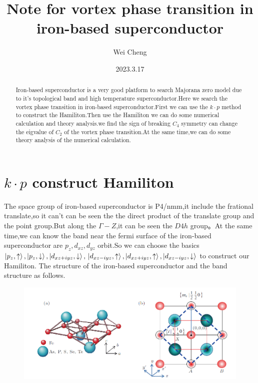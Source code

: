 \documentclass[5pt]{article}
\title{\LARGE {Note for vortex phase transition in iron-based superconductor}}
\author{\Large{Wei Cheng}}
\date{\Large{2023.3.17}}
\begin{document}
	\maketitle
	\Large
	\tableofcontents
	\everymath{\displaystyle}
	\begin{abstract}
		\Large
		Iron-based superconductor is a very good platform to search Majorana zero model due to it's topological band and high temperature superconductor.Here we search the vortex phase transition in iron-based superconductor.First we can use the $k\cdot p$ method to construct the Hamiliton.Then use the Hamiliton we can do some numerical calculation and theory analysis.we find the sign of breaking $C_4$ symmetry can change the eigvalue of $C_2$ of the vortex phase transition.At the same time,we can do some theory analysis of the numerical calculation.
	\end{abstract}
\section{$k\cdot p$ construct Hamiliton}
The space group of iron-based superconductor is P4/nmm,it include the frational translate,so it can't can be seen the the direct product of the translate group and the point group.But along the $\Gamma-Z$,it can be seen the $D4h$ group。At the same time,we can know the band near the fermi surface of the iron-based superconductor are $p_z,d_{xz},d_{yz}$ orbit.So we can choose the basics $\ket{p_z,\uparrow},\ket{p_z,\downarrow},\ket{d_{xz+iyz},\downarrow},\\
\ket{d_{xz-iyz},\uparrow},\ket{d_{xz+iyz},\uparrow},\ket{d_{xz-iyz},\downarrow}$ to construct our Hamiliton.
The structure of the iron-based superconductor and the band structure as follows.
\begin{figure}[H]
	\centering
	\includegraphics[scale=0.8]{figure/3}
	\caption{\cite{胡江平铁基}}
	\label{}
\end{figure}
\end{document}
